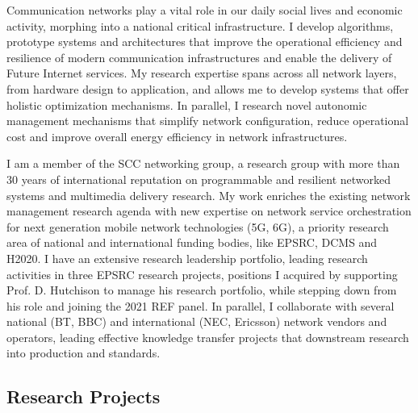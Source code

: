 \documentclass[10pt, a4paper]{article}
\begin{document}
Communication networks play a vital role in our daily social lives and economic
activity, morphing into a national critical infrastructure. I develop
algorithms, prototype systems and architectures that improve the operational
efficiency and resilience of modern communication infrastructures and
enable the delivery of Future Internet services. My research expertise spans
across all network layers, from hardware design to
application, and allows me to develop systems that offer holistic optimization
mechanisms. In parallel, I research novel autonomic management mechanisms that
simplify network configuration, reduce operational cost and
improve overall energy efficiency in network infrastructures. 

I am a member of the SCC networking group, a research group with more than 30 years of
international reputation on programmable and resilient networked
systems and multimedia delivery research. My work
enriches the existing network management research agenda with new expertise on
network service orchestration for next generation mobile network
technologies (5G, 6G), a priority research area of national and international
funding bodies, like EPSRC, DCMS and H2020. I have an extensive research
leadership portfolio, leading research activities in three EPSRC research
projects, positions I acquired by
supporting Prof. D. Hutchison to manage his research portfolio, while stepping
down from his role and joining the 2021 REF panel. In
parallel, I collaborate with several national (BT, BBC) and international (NEC,
Ericsson) network vendors and operators, leading effective knowledge transfer
projects that downstream research into production and standards. 

\subsection{Research Projects}
\end{document}
